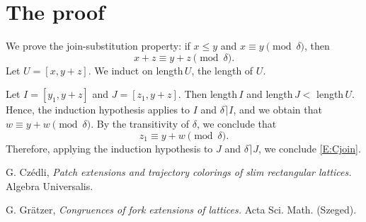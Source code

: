 \documentclass{amsart}
\begin{document}
\section{The proof}\label{Proof}%
We prove the join-substitution property:  
if $x \leq y$ and $x \equiv y \pmod{\delta}$, then
\begin{equation}\label{E:Cjoin}%
x + z \equiv y + z \pmod{\delta}.
\end{equation}
Let $U = [x, y+ z]$.
We induct on length\,$U$, the length of $U$.  

Let $I=[y_1,y+ z]$ and $J=[z_1,y+ z]$. 
Then length\,$I$ and length\,$J  < $ length\,$U$. 
Hence, the induction hypothesis applies to $I$ 
and $\delta\rceil I$, and we obtain that 
$w \equiv y+ w \pmod{\delta}$. 
By the transitivity of $\delta$, we conclude that 
\begin{equation}\label{E:three}%
z_1 \equiv y+ w \pmod{\delta}.
\end{equation}
Therefore, applying the induction hypothesis to $J$ 
and $\delta \rceil J$, we conclude \eqref{E:Cjoin}.

\begin{thebibliography}{9}
G. Cz\'edli,
\emph{Patch extensions and trajectory colorings of slim
rectangular lattices.}
Algebra Universalis. 

G. Gr\"atzer, 
\emph{Congruences of fork extensions of lattices.}
Acta Sci. Math. (Szeged). 
\end{thebibliography}
\end{document}
